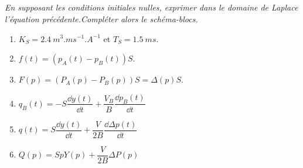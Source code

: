 \subparagraph{}
\textit{En supposant les conditions initiales nulles, exprimer dans le domaine de Laplace
l’équation précédente.Compléter alors le schéma-blocs.}%
\ifprof
\begin{corrige}
\end{corrige}
\else
\fi

\begin{enumerate}
\item $K_S = \SI{2,4}{m^3.ms^{-1}.A^{-1}}$ et $T_S = \SI{1,5}{ms}$.
\item $f(t)=\left(p_A(t)-p_B(t)\right)S$.
\item $F(p)=\left(P_A(p)-P_B(p)\right)S=\Delta (p)S$.
\item $q_B(t)=-S\dfrac{\dd y(t)}{\dd t}+\dfrac{V_B}{B}\dfrac{\dd p_B(t)}{\dd t}$
\item $q(t)=S\dfrac{\dd y(t)}{\dd t}+\dfrac{V}{2B}\dfrac{\dd \Delta p(t)}{\dd t}$
\item $Q(p)=SpY(p)+\dfrac{V}{2B}\Delta P (p)$
\end{enumerate}
